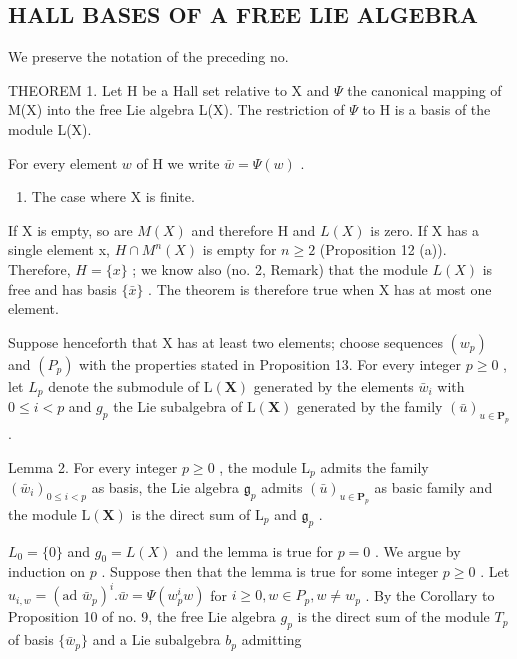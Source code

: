 \subsection{HALL BASES OF A FREE LIE ALGEBRA}

We preserve the notation of the preceding no.

THEOREM 1. Let H be a Hall set relative to X and \(\Psi\) the canonical mapping of M(X) into the free Lie algebra L(X). The restriction of \(\Psi\) to H is a basis of the module L(X).

For every element \(w\) of H we write \(\bar{w} = \Psi(w)\) .

\begin{enumerate}
\def\labelenumi{(\Alph{enumi})}
\tightlist
\item
  The case where X is finite.
\end{enumerate}

If X is empty, so are \(M(X)\) and therefore H and \(L(X)\) is zero. If X has a single element x, \(H \cap M^{n}(X)\) is empty for \(n \geqslant 2\) (Proposition 12 (a)). Therefore, \(H = \{x\}\) ; we know also (no. 2, Remark) that the module \(L(X)\) is free and has basis \(\{\bar{x}\}\) . The theorem is therefore true when X has at most one element.

Suppose henceforth that X has at least two elements; choose sequences \((w_{p})\) and \((P_{p})\) with the properties stated in Proposition 13. For every integer \(p \geqslant 0\) , let \(L_{p}\) denote the submodule of \(\mathrm{L}(\mathbf{X})\) generated by the elements \(\bar{w}_{i}\) with \(0 \leqslant i < p\) and \(g_{p}\) the Lie subalgebra of \(\mathrm{L}(\mathbf{X})\) generated by the family \((\bar{u})_{u \in \mathbf{P}_{p}}\) .

Lemma 2. For every integer \(p \geqslant 0\) , the module \(\mathrm{L}_p\) admits the family \((\bar{w}_i)_{0 \leqslant i < p}\) as basis, the Lie algebra \(\mathfrak{g}_p\) admits \((\bar{u})_{u \in \mathbf{P}_p}\) as basic family and the module \(\mathrm{L}(\mathbf{X})\) is the direct sum of \(\mathrm{L}_p\) and \(\mathfrak{g}_p\) .

\(L_{0} = \{0\}\) and \(g_{0} = L(X)\) and the lemma is true for \(p = 0\) . We argue by induction on \(p\) . Suppose then that the lemma is true for some integer \(p \geqslant 0\) . Let \(u_{i,w} = (\text{ad } \bar{w}_{p})^{i}. \bar{w} = \Psi(w_{p}^{i} w)\) for \(i \geqslant 0, w \in P_{p}, w \neq w_{p}\) . By the Corollary to Proposition 10 of no. 9, the free Lie algebra \(g_{p}\) is the direct sum of the module \(T_{p}\) of basis \(\{\bar{w}_{p}\}\) and a Lie subalgebra \(b_{p}\) admitting


